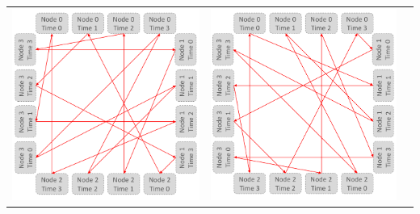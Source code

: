 \documentclass[11pt]{article}
\begin{document}
\begin{table}[H]
{\begin{tabular}{ccc}
			\includegraphics[scale=0.2]{figures/salesman-penalties7.png} &
			\includegraphics[scale=0.2]{figures/salesman-penalties8.png} &

\end{tabular}}
\end{table}
\end{document}
